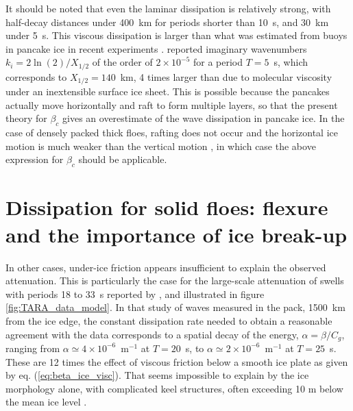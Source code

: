 
It should be noted that even the laminar dissipation is relatively strong, with half-decay distances under 400~km for periods shorter than 10~s, and 30~km under 5~s. This viscous dissipation is larger than what was estimated from buoys in pancake ice in recent experiments \citep{Ardhuin&al.2018b}. \cite{Rogers&al.2016} reported imaginary wavenumbers $k_i = 2 \ln(2) / X_{1/2}$ of the order of $2 \times 10^{-5}$ for a period $T=5$~s, which corresponds to $X_{1/2} = 140$~km, 4 times larger than due to molecular viscosity under an inextensible surface ice sheet. This is possible because the pancakes actually move horizontally and raft to form multiple layers, so that the present theory for $\beta_c$ gives an overestimate of the wave dissipation in pancake ice. In the case of densely packed thick floes, rafting does not occur and the horizontal ice motion is much weaker than the vertical motion \citep{Fox&Haskell2001}, in which case the above expression for $\beta_c$ should be applicable.

\section{Dissipation for solid floes: flexure and the importance of ice break-up}
In other cases, under-ice friction appears insufficient to explain the observed attenuation. This is particularly the case for the large-scale attenuation of  swells with periods 18 to 33~s reported by \cite{Ardhuin&al.2016}, and illustrated in figure \ref{fig:TARA_data_model}. In that study of waves measured in the pack, 1500~km from the ice edge, the constant dissipation rate needed to obtain a reasonable agreement with the data corresponds to a spatial decay of the energy, $\alpha=\beta/C_g$, ranging from $\alpha \simeq 4 \times10^{-6}$~m$^{-1}$ at $T=20$~s, to $\alpha\simeq 2 \times 10^{-6}$~m$^{-1}$ at $T=25$~s.
These are 12 times the effect of viscous friction below a smooth ice plate as given by eq. (\ref{eq:beta_ice_visc}). 
That seems impossible to explain by the ice morphology alone, with complicated keel structures, often exceeding 10 m below the mean ice level \citep{Doble&al.2011}.

